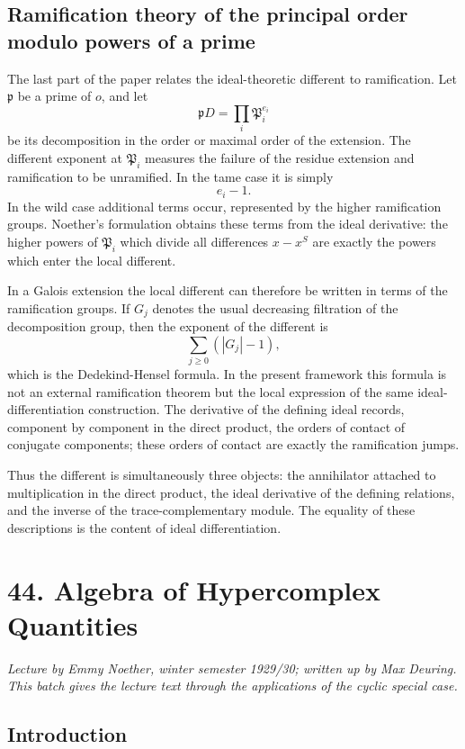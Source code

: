 \documentclass[11pt]{article}
\begin{document}
\subsection{Ramification theory of the principal order modulo powers of a prime}

The last part of the paper relates the ideal-theoretic different to ramification. Let \(\mathfrak p\) be a prime of \(o\), and let
\[
  \mathfrak pD=\prod_i \mathfrak P_i^{e_i}
\]
be its decomposition in the order or maximal order of the extension. The different exponent at \(\mathfrak P_i\) measures the failure of the residue extension and ramification to be unramified. In the tame case it is simply
\[
  e_i-1.
\]
In the wild case additional terms occur, represented by the higher ramification groups. Noether's formulation obtains these terms from the ideal derivative: the higher powers of \(\mathfrak P_i\) which divide all differences \(x-x^S\) are exactly the powers which enter the local different.

In a Galois extension the local different can therefore be written in terms of the ramification groups. If \(G_j\) denotes the usual decreasing filtration of the decomposition group, then the exponent of the different is
\[
  \sum_{j\ge0} (|G_j|-1),
\]
which is the Dedekind-Hensel formula. In the present framework this formula is not an external ramification theorem but the local expression of the same ideal-differentiation construction. The derivative of the defining ideal records, component by component in the direct product, the orders of contact of conjugate components; these orders of contact are exactly the ramification jumps.

Thus the different is simultaneously three objects: the annihilator attached to multiplication in the direct product, the ideal derivative of the defining relations, and the inverse of the trace-complementary module. The equality of these descriptions is the content of ideal differentiation.


\clearpage
\section{44. Algebra of Hypercomplex Quantities}

\textit{Lecture by Emmy Noether, winter semester 1929/30; written up by Max Deuring. This batch gives the lecture text through the applications of the cyclic special case.}

\subsection{Introduction}
\end{document}
